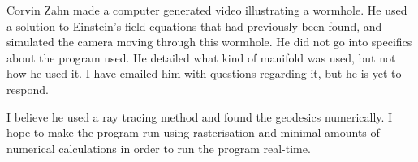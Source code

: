 \documentclass[12pt]{amsart}
\begin{document}
Corvin Zahn made a computer generated video illustrating a wormhole. He used a solution to Einstein's field equations that had previously been found, and simulated the camera moving through this wormhole. He did not go into specifics about the program used. He detailed what kind of manifold was used, but not how he used it. I have emailed him with questions regarding it, but he is yet to respond. \cite{spacetimetravel}

I believe he used a ray tracing method and found the geodesics numerically. I hope to make the program run using rasterisation and minimal amounts of numerical calculations in order to run the program real-time.

\nocite{CharlieGunn}




\end{document}
